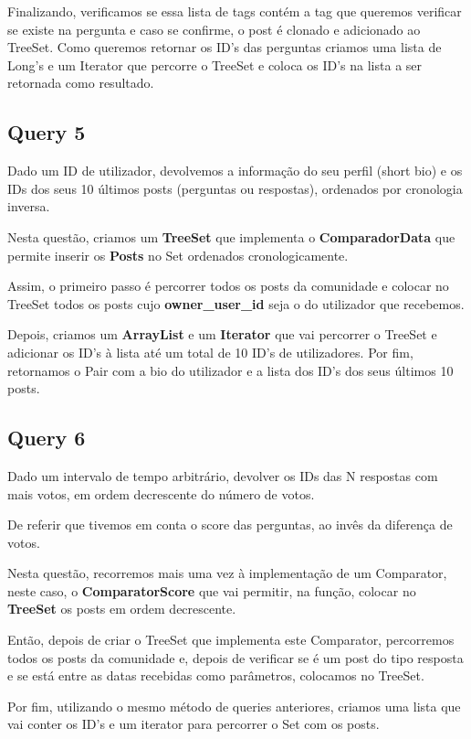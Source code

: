 \documentclass[a4paper]{article}
\begin{document}
Finalizando, verificamos se essa lista de tags contém a tag que queremos verificar 
se existe na pergunta e caso se confirme, o post é clonado e adicionado ao TreeSet.
Como queremos retornar os ID's das perguntas criamos uma lista de Long's e um 
Iterator que percorre o TreeSet e coloca os ID's na lista a ser retornada como
resultado.

\subsection{Query 5}

Dado um ID de utilizador, devolvemos a informação do seu perfil (short 
bio) e os IDs dos seus 10 últimos posts (perguntas ou respostas), 
ordenados por cronologia inversa.

Nesta questão, criamos um \textbf{TreeSet} que implementa o \textbf{ComparadorData}
que permite inserir os \textbf{Posts} no Set ordenados cronologicamente.

Assim, o primeiro passo é percorrer todos os posts da comunidade e colocar no TreeSet
todos os posts cujo \textbf{owner\_user\_id} seja o do utilizador que recebemos.

Depois, criamos um \textbf{ArrayList} e um \textbf{Iterator} que vai percorrer o
TreeSet e adicionar os ID's à lista até um total de 10 ID's de utilizadores. 
Por fim, retornamos o Pair com a bio do utilizador e a lista dos ID's dos seus
últimos 10 posts.

\subsection{Query 6}

Dado um intervalo de tempo arbitrário, devolver os IDs das N respostas 
com mais votos, em ordem decrescente do número de votos.

De referir que tivemos em conta o score das perguntas, ao invês da
diferença de votos.

Nesta questão, recorremos mais uma vez à implementação de um Comparator, neste caso,
o \textbf{ComparatorScore} que vai permitir, na função, colocar no \textbf{TreeSet}
os posts em ordem decrescente.

Então, depois de criar o TreeSet que implementa este Comparator, percorremos todos 
os posts da comunidade e, depois de verificar se é um post do tipo resposta e se 
está entre as datas recebidas como parâmetros, colocamos no TreeSet.

Por fim, utilizando o mesmo método de queries anteriores, criamos uma lista que vai
conter os ID's e um iterator para percorrer o Set com os posts. 
\end{document}
